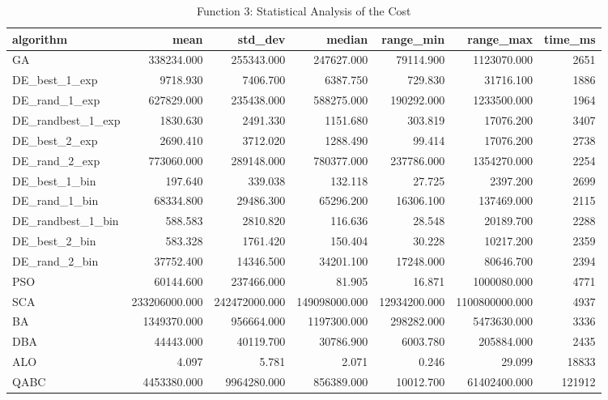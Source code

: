 \documentclass[12pt]{article}
\begin{document}
\begin{table}[H]
    \centering
    \footnotesize
    \begin{adjustbox}{width=1\textwidth}
\begin{tabular}{lrrrrrr}
\toprule
         algorithm &          mean &       std\_dev &        median &    range\_min &      range\_max &  time\_ms \\
\midrule
                GA &    338234.000 &    255343.000 &    247627.000 &    79114.900 &    1123070.000 &     2651 \\
     DE\_best\_1\_exp &      9718.930 &      7406.700 &      6387.750 &      729.830 &      31716.100 &     1886 \\
     DE\_rand\_1\_exp &    627829.000 &    235438.000 &    588275.000 &   190292.000 &    1233500.000 &     1964 \\
 DE\_randbest\_1\_exp &      1830.630 &      2491.330 &      1151.680 &      303.819 &      17076.200 &     3407 \\
     DE\_best\_2\_exp &      2690.410 &      3712.020 &      1288.490 &       99.414 &      17076.200 &     2738 \\
     DE\_rand\_2\_exp &    773060.000 &    289148.000 &    780377.000 &   237786.000 &    1354270.000 &     2254 \\
     DE\_best\_1\_bin &       197.640 &       339.038 &       132.118 &       27.725 &       2397.200 &     2699 \\
     DE\_rand\_1\_bin &     68334.800 &     29486.300 &     65296.200 &    16306.100 &     137469.000 &     2115 \\
 DE\_randbest\_1\_bin &       588.583 &      2810.820 &       116.636 &       28.548 &      20189.700 &     2288 \\
     DE\_best\_2\_bin &       583.328 &      1761.420 &       150.404 &       30.228 &      10217.200 &     2359 \\
     DE\_rand\_2\_bin &     37752.400 &     14346.500 &     34201.100 &    17248.000 &      80646.700 &     2394 \\
               PSO &     60144.600 &    237466.000 &        81.905 &       16.871 &    1000080.000 &     4771 \\
               SCA & 233206000.000 & 242472000.000 & 149098000.000 & 12934200.000 & 1100800000.000 &     4937 \\
                BA &   1349370.000 &    956664.000 &   1197300.000 &   298282.000 &    5473630.000 &     3336 \\
               DBA &     44443.000 &     40119.700 &     30786.900 &     6003.780 &     205884.000 &     2435 \\
               ALO &         4.097 &         5.781 &         2.071 &        0.246 &         29.099 &    18833 \\
              QABC &   4453380.000 &   9964280.000 &    856389.000 &    10012.700 &   61402400.000 &   121912 \\
\bottomrule
\end{tabular}


    \end{adjustbox}
    \caption{Function 3: Statistical Analysis of the Cost} 
    \end{table}
\end{document}
